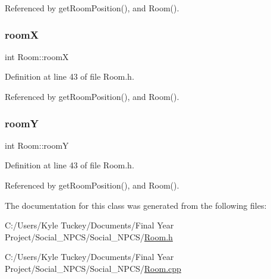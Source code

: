 Referenced by get\+Room\+Position(), and Room().

\mbox{\label{class_room_a5cb7d8efa1ea04af080f7e2c041fea1a}} 
\subsubsection{\texorpdfstring{roomX}{roomX}}
{\footnotesize\ttfamily int Room\+::roomX\hspace{0.3cm}{\ttfamily [private]}}



Definition at line 43 of file Room.\+h.



Referenced by get\+Room\+Position(), and Room().

\mbox{\label{class_room_a702c5d200cedc6e9eef5cbc2034fdc17}} 
\subsubsection{\texorpdfstring{roomY}{roomY}}
{\footnotesize\ttfamily int Room\+::roomY\hspace{0.3cm}{\ttfamily [private]}}



Definition at line 43 of file Room.\+h.



Referenced by get\+Room\+Position(), and Room().



The documentation for this class was generated from the following files\+:\begin{DoxyCompactItemize}
\item 
C\+:/\+Users/\+Kyle Tuckey/\+Documents/\+Final Year Project/\+Social\+\_\+\+N\+P\+C\+S/\+Social\+\_\+\+N\+P\+C\+S/\hyperlink{_room_8h}{Room.\+h}\item 
C\+:/\+Users/\+Kyle Tuckey/\+Documents/\+Final Year Project/\+Social\+\_\+\+N\+P\+C\+S/\+Social\+\_\+\+N\+P\+C\+S/\hyperlink{_room_8cpp}{Room.\+cpp}\end{DoxyCompactItemize}
